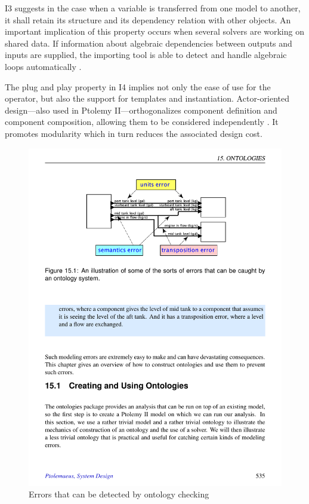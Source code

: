 \documentclass[journal,onecolumn]{IEEEtran} %
\begin{document}
I3 suggests in the case when a variable is transferred from one model to another, it shall retain its structure and its dependency relation with other objects. An important implication of this property occurs when several solvers are working on shared data. If information about algebraic dependencies between outputs and inputs are supplied, the importing tool is able to detect and handle algebraic loops automatically \cite{Blochwitz2011}.
 
The plug and play property in I4 implies not only the ease of use for the operator, but also the support for templates and instantiation. Actor-oriented design---also used in Ptolemy II---orthogonalizes component definition and component composition, allowing them to be considered independently \cite{Lee2004}. It promotes modularity which in turn reduces the associated design cost. 

\begin{figure}[hbt!]
  \centering
  \includegraphics[scale=1]{figures/o2ont.pdf}
  \caption{Errors that can be detected by ontology checking  \cite{Ptolemaeus2014}}
  \label{fig:o2ont}
\end{figure}
\end{document}
